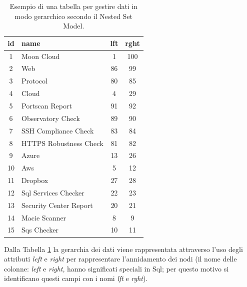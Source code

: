 \begin{table}[ht!]
\centering
\begin{tabular}[c]{| c | l | c | c |}
    \hline
    id & name & lft & rght \\ [0.5ex] 
    \hline
    \rowcolor{rootnodecell} 1 & Moon Cloud & 1 & 100 \\ [0.5ex] 
    \rowcolor{categorycell} 2 & Web & 86 & 99 \\ [0.5ex] 
    \rowcolor{categorycell} 3 & Protocol & 80 & 85 \\ [0.5ex] 
    \rowcolor{categorycell} 4 & Cloud & 4 & 29 \\ [0.5ex] 
    \rowcolor{evaluationcell} 5 & Portscan Report & 91 & 92 \\ [0.5ex] 
    \rowcolor{evaluationcell} 6 & Observatory Check & 89 & 90 \\ [0.5ex] 
    \rowcolor{evaluationcell} 7 & SSH Compliance Check & 83 & 84 \\ [0.5ex] 
    \rowcolor{evaluationcell} 8 & HTTPS Robustness Check & 81 & 82 \\ [0.5ex] 
    \rowcolor{categorycell} 9 & Azure & 13 & 26 \\ [0.5ex] 
    \rowcolor{categorycell} 10 & Aws & 5 & 12 \\ [0.5ex] 
    \rowcolor{categorycell} 11 & Dropbox & 27 & 28 \\ [0.5ex] 
    \rowcolor{evaluationcell} 12 & Sql Services Checker & 22 & 23 \\ [0.5ex] 
    \rowcolor{evaluationcell} 13 & Security Center Report & 20 & 21 \\ [0.5ex] 
    \rowcolor{evaluationcell} 14 & Macie Scanner & 8 & 9 \\ [0.5ex] 
    \rowcolor{evaluationcell} 15 & Sqs Checker & 10 & 11 \\ [0.5ex]
    \hline
\end{tabular}
\caption{Esempio di una tabella per gestire dati in modo gerarchico secondo il Nested Set Model.}
\label{table:nested_set_model_table}
\end{table}
\hfill\break
Dalla Tabella \ref{table:nested_set_model_table} la gerarchia dei dati viene rappresentata attraverso l'uso 
degli attributi \textit{left} e \textit{right} per rappresentare l'annidamento dei nodi (il nome delle colonne: \textit{left} e \textit{right}, hanno significati 
speciali in Sql; per questo motivo si identificano questi campi con i nomi \textit{lft} e \textit{rght}).
%
\newpage
%

